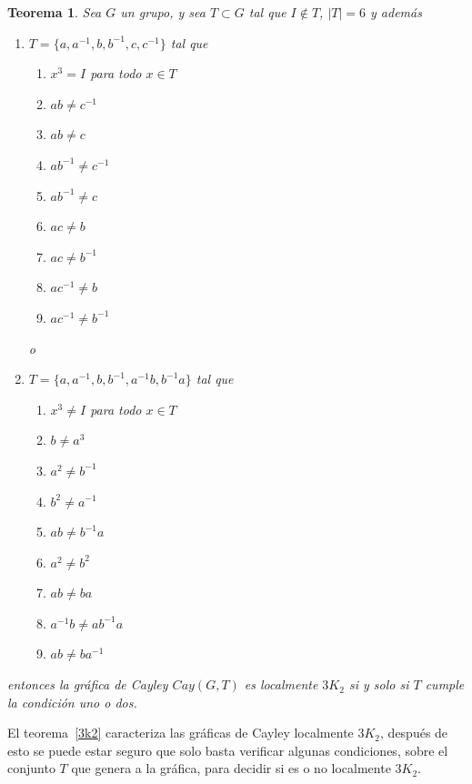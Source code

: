 \documentclass[12pt]{book}
\newtheorem{theorem}{Teorema}
\theoremstyle{definition}
\begin{document}
\begin{theorem}
  Sea $G$ un grupo, y sea $T\subset G$ tal que $I\notin T$, $|T|=6$ y
  además

  \begin{enumerate}
  \item $T=\{a, a^{-1},b , b^{-1}, c, c^{-1}\}$ tal que

    \begin{enumerate}
    \item $x^3=I$ para todo $x\in T$
    \item $ab\neq c^{-1}$
    \item $ab\neq c$
    \item $ab^{-1}\neq c^{-1}$
    \item $ab^{-1}\neq c$
    \item $ac\neq b$
    \item $ac\neq b^{-1}$
    \item $ac^{-1}\neq b$
    \item $ac^{-1}\neq b^{-1}$
    \end{enumerate}


    o


  \item $T=\{a, a^{-1}, b, b^{-1}, a^{-1}b, b^{-1}a\}$ tal que

    \begin{enumerate}
    \item $x^3\neq I$ para todo $x\in T$
    \item $b\neq a^3$
    \item $a^2\neq b^{-1}$
    \item $b^2\neq a^{-1}$
    \item $ab\neq b^{-1}a$
    \item $a^2\neq b^2$
    \item $ab\neq ba$
    \item $a^{-1}b\neq ab^{-1}a$
    \item $ab\neq ba^{-1}$
    \end{enumerate}
  \end{enumerate}

  entonces la gráfica de Cayley $Cay(G,T)$ es localmente $3K_2$ si y
  solo si $T$ cumple la condición uno o dos.

\end{theorem}\label{3k2}


El teorema~\ref{3k2} caracteriza las gráficas de Cayley localmente
$3K_2$, después de esto se puede estar seguro que solo basta verificar
algunas condiciones, sobre el conjunto $T$ que genera a la gráfica,
para decidir si es o no localmente $3K_2$.
\end{document}
